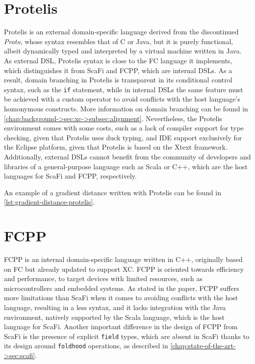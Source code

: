 \section{Protelis} \label{chap:state-of-the-art->sec:protelis}

Protelis is an external domain-specific language derived from the discontinued \textit{Proto}, whose syntax resembles that of C or Java, but it is purely functional, albeit dynamically typed and interpreted by a virtual machine written in Java\cite{protelis}.
%
As external \ac{DSL}, Protelis syntax is close to the \ac{FC} language it implements, which distinguishes it from ScaFi and FCPP, which are internal \acp{DSL}.
%
As a result, domain branching in Protelis is transparent in its conditional control syntax, such as the \texttt{if} statement, while in internal \acp{DSL} the same feature must be achieved with a custom operator to avoid conflicts with the host language's homonymous constructs.
%
More information on domain branching can be found in \cref{chap:background->sec:xc->subsec:alignment}.
%
Nevertheless, the Protelis environment comes with some costs, such as a lack of compiler support for type checking, given that Protelis uses duck typing, and IDE support exclusively for the Eclipse platform, given that Protelis is based on the Xtext framework\cite{xtext}.
%
Additionally, external \acp{DSL} cannot benefit from the community of developers and libraries of a general-purpose language such as Scala or C++, which are the host languages for ScaFi and FCPP, respectively.

An example of a gradient distance written with Protelis can be found in \cref{lst:gradient-distance-protelis}.




\section{FCPP} \label{chap:state-of-the-art->sec:fcpp}

FCPP is an internal domain-specific language written in C++, originally based on \ac{FC} but already updated to support \ac{XC}\cite{xc}.
%
FCPP is oriented towards efficiency and performance, to target devices with limited resources, such as microcontrollers and embedded systems\cite{fcpp}.
%
As stated in the paper, FCPP suffers more limitations than ScaFi when it comes to avoiding conflicts with the host language, resulting in a less  syntax, and it lacks integration with the Java environment, natively supported by the Scala language, which is the host language for ScaFi\cite{fcpp}.
%
Another important difference in the design of FCPP from ScaFi is the presence of explicit \texttt{field} types, which are absent in ScaFi thanks to its design around \texttt{foldhood} operations, as described in \cref{chap:state-of-the-art->sec:scafi}.

